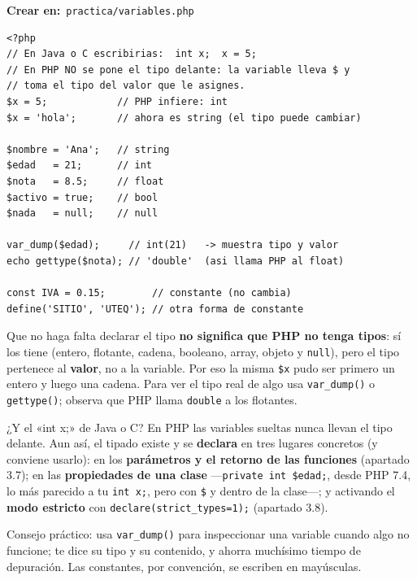 \documentclass[11pt]{article}
\begin{document}
{\small\color{phpazulo}\textbf{Crear en:}~}\texttt{practica/\allowbreak{}variables.\allowbreak{}php}\par\nobreak\vspace{-1pt}
\begin{cajacodigo}
\begin{lstlisting}[style=php]
<?php
// En Java o C escribirias:  int x;  x = 5;
// En PHP NO se pone el tipo delante: la variable lleva $ y
// toma el tipo del valor que le asignes.
$x = 5;            // PHP infiere: int
$x = 'hola';       // ahora es string (el tipo puede cambiar)

$nombre = 'Ana';   // string
$edad   = 21;      // int
$nota   = 8.5;     // float
$activo = true;    // bool
$nada   = null;    // null

var_dump($edad);     // int(21)   -> muestra tipo y valor
echo gettype($nota); // 'double'  (asi llama PHP al float)

const IVA = 0.15;        // constante (no cambia)
define('SITIO', 'UTEQ'); // otra forma de constante
\end{lstlisting}
\end{cajacodigo}
\vspace{2pt}
Que no haga falta declarar el tipo \textbf{no significa que PHP no tenga tipos}: sí los tiene (entero, flotante, cadena, booleano, array, objeto y \texttt{null}), pero el tipo pertenece al \textbf{valor}, no a la variable. Por eso la misma \texttt{\$x} pudo ser primero un entero y luego una cadena. Para ver el tipo real de algo usa \texttt{var\_dump()} o \texttt{gettype()}; observa que PHP llama \texttt{double} a los flotantes.

\begin{cajatip}{¿Y el «int x;» de Java o C?}
En PHP las variables sueltas nunca llevan el tipo delante. Aun así, el tipado existe y se \textbf{declara} en tres lugares concretos (y conviene usarlo): en los \textbf{parámetros y el retorno de las funciones} (apartado 3.7); en las \textbf{propiedades de una clase} ---\texttt{private int \$edad;\allowbreak{}}, desde PHP 7.4, lo más parecido a tu \texttt{int x;\allowbreak{}}, pero con \texttt{\$} y dentro de la clase---; y activando el \textbf{modo estricto} con \texttt{declare(strict\_types=\allowbreak{}1);\allowbreak{}} (apartado 3.8).\par
\end{cajatip}
Consejo práctico: usa \texttt{var\_dump()} para inspeccionar una variable cuando algo no funcione; te dice su tipo y su contenido, y ahorra muchísimo tiempo de depuración. Las constantes, por convención, se escriben en mayúsculas.
\end{document}
